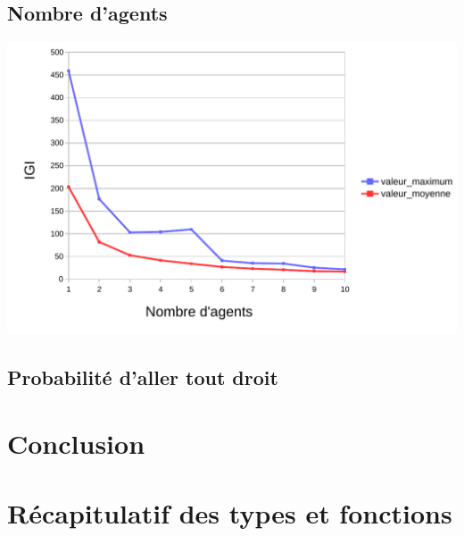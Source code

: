\documentclass{article}
\begin{document}
    \subsection{Nombre d'agents}
    \begin{center}
        \includegraphics[width = \textwidth]{graphes pdf/variance tortues IGI spirale.pdf}
    \end{center}
    \subsection{Probabilité d'aller tout droit}
\section{Conclusion}
    \subsection{}

\appendix
\newpage
\section{Récapitulatif des types et fonctions}
\end{document}
